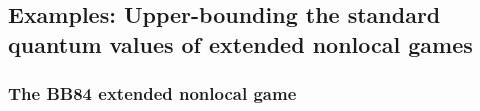 \subsection{Examples: Upper-bounding the standard quantum values of extended nonlocal games} \label{sec:examples-upper-bounds-extended-npa}

\subsubsection*{The BB84 extended nonlocal game}

